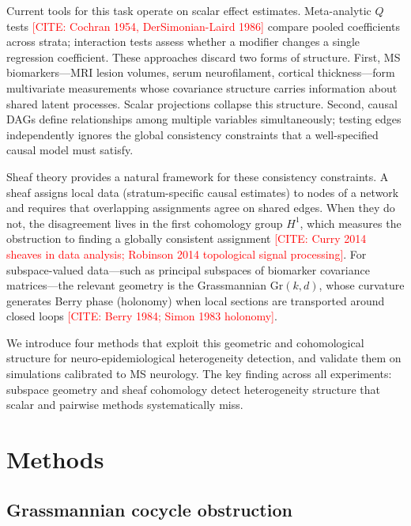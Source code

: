 \documentclass[11pt]{article}
\newcommand{\Gr}{\mathrm{Gr}}
\newcommand{\misscite}[1]{\textcolor{red}{[CITE: #1]}}
\begin{document}
Current tools for this task operate on scalar effect estimates.
Meta-analytic $Q$ tests \misscite{Cochran 1954, DerSimonian-Laird 1986}
compare pooled coefficients across strata; interaction tests assess
whether a modifier changes a single regression coefficient. These
approaches discard two forms of structure. First, MS biomarkers---MRI
lesion volumes, serum neurofilament, cortical thickness---form
multivariate measurements whose covariance structure carries information
about shared latent processes. Scalar projections collapse this structure.
Second, causal DAGs define relationships among multiple variables
simultaneously; testing edges independently ignores the global consistency
constraints that a well-specified causal model must satisfy.

Sheaf theory provides a natural framework for these consistency
constraints. A sheaf assigns local data (stratum-specific causal
estimates) to nodes of a network and requires that overlapping
assignments agree on shared edges. When they do not, the disagreement
lives in the first cohomology group $H^1$, which measures the
obstruction to finding a globally consistent assignment
\misscite{Curry 2014 sheaves in data analysis;
Robinson 2014 topological signal processing}. For subspace-valued
data---such as principal subspaces of biomarker covariance
matrices---the relevant geometry is the Grassmannian $\Gr(k,d)$, whose
curvature generates Berry phase (holonomy) when local sections are
transported around closed loops
\misscite{Berry 1984; Simon 1983 holonomy}.

We introduce four methods that exploit this geometric and cohomological
structure for neuro-epidemiological heterogeneity detection, and validate
them on simulations calibrated to MS neurology. The key finding across
all experiments: subspace geometry and sheaf cohomology detect
heterogeneity structure that scalar and pairwise methods systematically
miss.

\section{Methods}

\subsection{Grassmannian cocycle obstruction}
\end{document}
